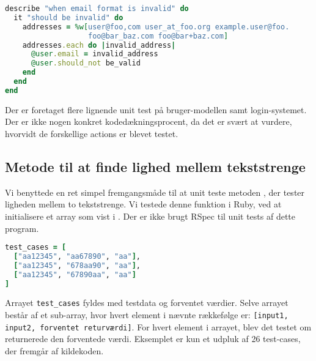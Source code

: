 \begin{lstlisting}[caption={Unit test af en brugers email er valid, når han/hun opretter sig som bruger},label=lst:email,language=Ruby]
describe "when email format is invalid" do
  it "should be invalid" do
    addresses = %w[user@foo,com user_at_foo.org example.user@foo.
                   foo@bar_baz.com foo@bar+baz.com]
    addresses.each do |invalid_address|
      @user.email = invalid_address
      @user.should_not be_valid
    end
  end
end
\end{lstlisting}

Der er foretaget flere lignende unit test på bruger-modellen samt login-systemet. Der er ikke nogen konkret kodedækningsprocent, da det er svært at vurdere, hvorvidt de forskellige actions er blevet testet.

\subsection{Metode til at finde lighed mellem tekststrenge}
Vi benyttede en ret simpel fremgangsmåde til at unit teste metoden , der tester ligheden mellem to tekststrenge. Vi testede denne funktion i Ruby, ved at initialisere et array som vist i . Der er ikke brugt RSpec til unit tests af dette program.

\begin{lstlisting}[caption={Et eksempel på en række testcases til brug ved unit test.},label=lst:testcases,language=Ruby]
test_cases = [
  ["aa12345", "aa67890", "aa"],
  ["aa12345", "678aa90", "aa"],
  ["aa12345", "67890aa", "aa"]
]
\end{lstlisting}

Arrayet \texttt{test\_cases} fyldes med testdata og forventet værdier. Selve arrayet består af et sub-array, hvor hvert element i nævnte rækkefølge er: \lstinline{[input1, input2, forventet returværdi]}.
For hvert element i arrayet, blev det testet om  returnerede den forventede værdi. Eksemplet er kun et udpluk af 26 test-cases, der fremgår af kildekoden.
